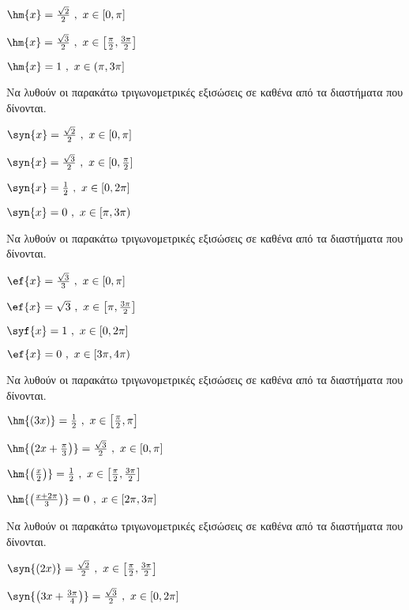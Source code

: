 \begin{multicols}{2}
\begin{rlist}
\item $ \hm{x}=\frac{\sqrt{2}}{2}\ ,\ x\in[0,\pi] $
\item $ \hm{x}=\frac{\sqrt{3}}{2}\ ,\ x\in\left[\frac{\pi}{2},\frac{3\pi}{2}\right]  $
\item $ \hm{x}=1\ ,\ x\in(\pi,3\pi] $
\end{rlist}
\Askhsh Να λυθούν οι παρακάτω τριγωνομετρικές εξισώσεις σε καθένα από τα διαστήματα που δίνονται.
\begin{rlist}
\item $ \syn{x}=\frac{\sqrt{2}}{2}\ ,\ x\in\left[0,\pi\right]  $
\item $ \syn{x}=\frac{\sqrt{3}}{2}\ ,\ x\in[0,\frac{\pi}{2}] $
\item $ \syn{x}=\frac{1}{2}\ ,\ x\in\left[0,2\pi\right]  $
\item $ \syn{x}=0\ ,\ x\in[\pi,3\pi) $
\end{rlist}
\Askhsh Να λυθούν οι παρακάτω τριγωνομετρικές εξισώσεις σε καθένα από τα διαστήματα που δίνονται.
\begin{rlist}
\item $ \ef{x}=\frac{\sqrt{3}}{3}\ ,\ x\in\left[0,\pi\right]  $
\item $ \ef{x}=\sqrt{3}\ ,\ x\in\left[ \pi,\frac{3\pi}{2}\right]  $
\item $ \syf{x}=1\ ,\ x\in\left[0,2\pi\right]  $
\item $ \ef{x}=0\ ,\ x\in[3\pi,4\pi) $
\end{rlist}
\Askhsh Να λυθούν οι παρακάτω τριγωνομετρικές εξισώσεις σε καθένα από τα διαστήματα που δίνονται.
\begin{rlist}
\item $ \hm{(3x)}=\frac{1}{2}\ ,\ x\in\left[\frac{\pi}{2},\pi\right]  $
\item $ \hm{\left(2x+\frac{\pi}{3}\right) }=\frac{\sqrt{3}}{2}\ ,\ x\in[0,\pi] $
\item $ \hm{\left(\frac{x}{2}\right) }=\frac{1}{2}\ ,\ x\in\left[\frac{\pi}{2},\frac{3\pi}{2}\right]  $
\item $ \hm{\left(\frac{x+2\pi}{3}\right) }=0\ ,\ x\in[2\pi,3\pi] $
\end{rlist}
\Askhsh Να λυθούν οι παρακάτω τριγωνομετρικές εξισώσεις σε καθένα από τα διαστήματα που δίνονται.
\begin{rlist}
\item $ \syn{(2x)}=\frac{\sqrt{2}}{2}\ ,\ x\in\left[\frac{\pi}{2},\frac{3\pi}{2}\right]  $
\item $ \syn{\left(3x+\frac{3\pi}{4}\right) }=\frac{\sqrt{3}}{2}\ ,\ x\in[0,2\pi] $

\end{rlist}
\end{multicols}
